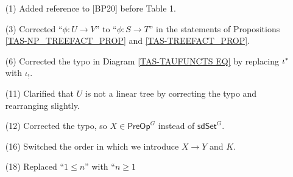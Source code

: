 \documentclass[a4paper,10pt
]{article}%
\numberwithin{equation}{section}
\numberwithin{figure}{section}
\theoremstyle{definition} %
\newcommand{\1}{\ensuremath{\mathbbm 1}}%
\begin{document}
\begin{enumerate}
\item[(1)] Added reference to [BP20] before Table 1.
\item[(3)] Corrected ``$\phi \colon U \to V$'' to ``$\phi \colon S \to T$'' in the statements of Propositions \ref{TAS-NP_TREEFACT_PROP} and \ref{TAS-TREEFACT_PROP}.
\item[(6)] Corrected the typo in Diagram \eqref{TAS-TAUFUNCTS EQ} by replacing $\iota^{\**}$ with $\iota_!$.
\item[(11)] Clarified that $U$ is not a linear tree by correcting the typo and rearranging slightly.
\item[(12)] Corrected the typo, so $X \in \mathsf{PreOp}^G$ instead of $\mathsf{sdSet}^G$.
\item[(16)] Switched the order in which we introduce $X \to Y$ and $K$.
\item[(18)] Replaced ``$1 \leq n$'' with ``$n \geq 1$
\end{enumerate}
\end{document}
